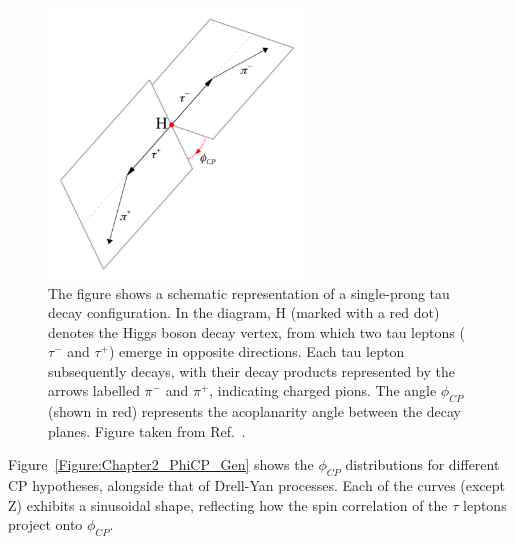 \begin{figure}[h]
\centering
\includegraphics[width= 0.6\textwidth]{Figures/Chapter2/DecayPlanes.png}
\caption{The figure shows a schematic representation of a single-prong tau decay configuration. In the diagram, H (marked with a red dot) denotes the Higgs boson decay vertex, from which two tau leptons ($\tau^{-}$ and $\tau^{+}$) emerge in opposite directions. Each tau lepton subsequently decays, with their decay products represented by the arrows labelled $\pi^{-}$ and $\pi^{+}$, indicating charged pions. The angle $\phi_{CP}$ (shown in red) represents the acoplanarity angle between the decay planes. Figure taken from Ref.~\cite{HiggsCP_CMS_2021}.}
\label{Figure:Chapter2_DecayPlanes}
\end{figure}

Figure~\ref{Figure:Chapter2_PhiCP_Gen} shows the $\phi_{CP}$ distributions for different CP hypotheses, alongside that of Drell-Yan processes. Each of the curves (except Z) exhibits a sinusoidal shape, reflecting how the spin correlation of the $\tau$ leptons project onto $\phi_{CP}$. 

